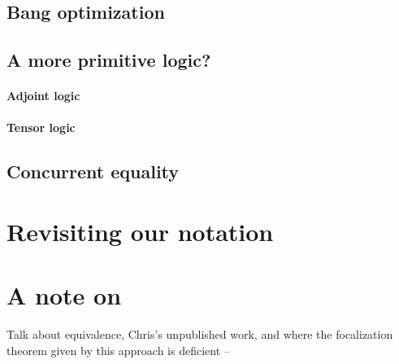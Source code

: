 \subsection{Bang optimization}

\subsection{A more primitive logic?}

\paragraph{Adjoint logic}

\paragraph{Tensor logic}

\subsection{Concurrent equality}

\section{Revisiting our notation}

\section{A note on }

Talk about equivalence, Chris's unpublished work, and where
the focalization theorem given by this approach is deficient -- 